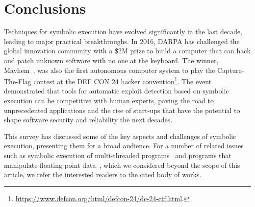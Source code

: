 
\section{Conclusions}
\label{se:conclusions}

Techniques for symbolic execution have evolved significantly in the last decade, leading to major practical breakthroughs. In 2016, DARPA has challenged the global innovation community with a \$2M prize to build a computer that can hack and patch unknown software with no one at the keyboard. The winner, {\sc Mayhem}~\cite{MAYHEM-SP12}, was also the first autonomous computer system to play the Capture-The-Flag contest at the DEF CON 24 hacker convention\footnote{\url{https://www.defcon.org/html/defcon-24/dc-24-ctf.html}.}. The event demonstrated that tools for automatic exploit detection based on symbolic execution can be competitive with human experts, paving the road to unprecedented applications and the rise of start-ups that have the potential to shape software security and reliability the next decades. 

This survey has discussed some of the key aspects and challenges of symbolic execution, presenting them for a broad audience. For a number of related issues such as symbolic execution of multi-threaded programs~\cite{KPV-TACAS03,SA-HVC06,CLOUD9-EUROSYS11,FHR-ESEC13,BGC-OOPSLA14,GKW-ESEC15} and programs that manipulate floating point data~\cite{M-STVR01,BGM-STVR06,LTH-ICTSS10,CCK-EUROSYS11,BVL-POPL13,CCK-TSE14,RPW-SIGSOFT15}, which we considered beyond the scope of this article, we refer the interested readers to the cited body of works.


